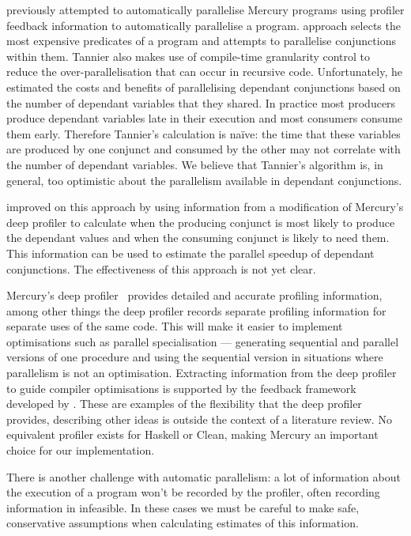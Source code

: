 \citet{tannier:2007:parallel} previously attempted to automatically
parallelise Mercury programs using profiler feedback
information to automatically parallelise a program.
\citet{tannier:2007:parallel} approach selects the most expensive predicates
of a program and attempts to parallelise conjunctions within them.
Tannier also makes use of compile-time granularity
control to reduce the over-parallelisation that can occur in recursive
code.
Unfortunately, he estimated the costs and benefits of parallelising
dependant conjunctions based on the number of dependant variables that
they shared.
In practice most producers produce dependant variables late in their
execution and most consumers consume them early.
Therefore Tannier's calculation is na\"ive: the time that these
variables are produced by one conjunct and consumed by the other may
not correlate with the number of dependant variables.
We believe that Tannier's algorithm is, in general, too optimistic
about the parallelism available in dependant conjunctions.

\citet{bone:2008:hons} improved on this approach by using
information from a modification of Mercury's deep profiler to
calculate when the producing conjunct is most likely to produce the
dependant values and when the consuming conjunct is likely to need
them.
This information can be used to estimate the parallel speedup of
dependant conjunctions.
The effectiveness of this approach is not yet clear.

Mercury's deep profiler~\citep{conway:2001:mercury-deep} provides
detailed and accurate profiling information,
among other things the deep profiler records separate profiling
information for separate uses of the same code.
This will make it easier to implement optimisations such as
parallel specialisation --- generating sequential and parallel
versions of one procedure and using the sequential version
in situations where parallelism is not an optimisation.
Extracting information from the deep profiler to guide compiler
optimisations is supported by the feedback framework developed by
\citet{bone:2008:hons}.
These are examples of the flexibility that the deep profiler provides,
describing other ideas is outside the context of a literature review.
No equivalent profiler exists for Haskell or Clean, making Mercury an
important choice for our implementation.

There is another challenge with automatic parallelism: a lot of
information about the execution of a program won't be recorded by the
profiler, often recording information in infeasible.
In these cases we must be careful to make safe, conservative
assumptions when calculating estimates of this information.

